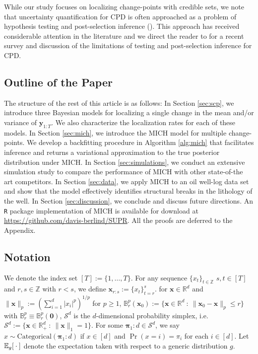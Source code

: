 While our study focuses on localizing change-points with credible sets, we note that uncertainty quantification for CPD is often approached as a problem of hypothesis testing and post-selection inference (\citealp{Horváth12,Preuss15,Duy20,Hyun21,Jewell22}). This approach has received considerable attention in the literature and we direct the reader to \cite{Fryzlewicz24} for a recent survey and discussion of the limitations of testing and post-selection inference for CPD. 

\subsection{Outline of the Paper}

The structure of the rest of this article is as follows: In Section \ref{sec:scp}, we introduce three Bayesian models for localizing a single change in the mean and/or variance of $\mathbf{y}_{1:T}$. We also characterize the localization rates for each of these models. In Section \ref{sec:mich}, we introduce the MICH model for multiple change-points. We develop a backfitting procedure in Algorithm \ref{alg:mich} that facilitates inference and returns a variational approximation to the true posterior distribution under MICH. In Section \ref{sec:simulations}, we conduct an extensive simulation study to compare the performance of MICH with other state-of-the art competitors. In Section \ref{sec:data}, we apply MICH to an oil well-log data set and show that the model effectively identifies structural breaks in the lithology of the well. In Section \ref{sec:discussion}, we conclude and discuss future directions. An \texttt{R} package implementation of MICH is available for download at \url{https://github.com/davis-berlind/SUPR}. All the proofs are deferred to the Appendix. 

\subsection{Notation}

We denote the index set $[T] := \{1, \ldots, T\}$. For any sequence $\{x_t\}_{t\in\mathbb{Z}}$ $s,t\in[T]$ and $r,s \in \mathbb{Z}$ with $r<s$, we define $\mathbf{x}_{r:s} := \{x_t\}_{t=r}^s$. for $\mathbf{x}\in\mathbb{R}^d$ and  $\lVert \mathbf{x} \rVert_p := (\sum_{i=1}^d |x_i|^p)^{1/p}$ for $p \geq 1$, $\mathbb{B}_{r}^{p}(\mathbf{x}_0) := \{\mathbf{x}\in\mathbb{R}^d \::\: \lVert \mathbf{x}_0 - \mathbf{x} \rVert_p \leq r\}$ with $\mathbb{B}_{r}^{p} \equiv \mathbb{B}_{r}^{p}(\mathbf{0})$, $\mathcal{S}^d$ is the $d$-dimensional probability simplex, i.e. $\mathcal{S}^d := \{\mathbf{x}\in\mathbb{R}^d_+ \::\: \lVert \mathbf{x} \rVert_1 =1\}$. For some $\boldsymbol{\pi}_1:d \in \mathcal{S}^d$, we say $x \sim \text{Categorical}(\boldsymbol{\pi}_1:d)$ if $x \in [d]$ and $\Pr(x = i) = \pi_i$ for each $i \in [d]$. Let $\mathbb{E}_{g} [\:\cdot\:]$ denote the expectation taken with respect to a generic distribution $g$.